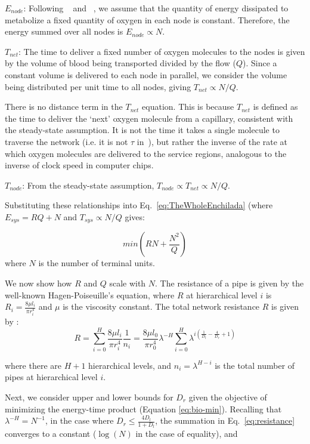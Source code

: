 \documentclass[12pt]{article}
\begin{document}
$E_{node}$: Following ~\cite{west97} and ~\cite{moses08}, we assume that the
quantity of energy dissipated to metabolize a fixed quantity of oxygen in each
node is constant.  Therefore, the energy summed over all nodes is $E_{node} \propto
N$.

$T_{net}$: The time to deliver a fixed number of oxygen molecules to the nodes
is given by the volume of blood being transported divided by the flow ($Q$).
Since a constant volume is delivered to each node in parallel, we consider the
volume being distributed per unit time to all nodes, giving $T_{net}\propto
N/Q$.  

There is no distance term in the $T_{net}$ equation.  This is because $T_{net}$  is
defined as the time to deliver the `next'
oxygen molecule from a capillary, consistent with the
steady-state assumption.   It is not the time it takes a
single molecule to traverse the network (i.e. it is not $\tau$
in~\cite{banavar10}), but rather the inverse of the rate at which
oxygen molecules are delivered to the service regions, analogous to the inverse of clock speed in computer chips.

$T_{node}$: From the steady-state assumption, $T_{node} \propto T_{net} \propto N/Q$. 



Substituting these relationships into Eq.~\ref{eq:TheWholeEnchilada} (where $E_{sys} = RQ + N$ and $T_{sys} \propto N/Q$ gives:

\begin{equation}
 min (RN + \frac{N^2}{Q})
\label{eq:bio-min}
\end{equation}
\noindent where $N$ is the number of terminal units.  

We now show how $R$ and $Q$ scale with $N$. The resistance of a pipe is given by the well-known Hagen-Poiseuille's
equation, where $R$ at hierarchical level $i$ is $R_i = \frac{8\mu l_i}{\pi
r_i^4}$ and $\mu$ is the viscosity constant.  The total network resistance
$R$ is given by \cite{west97}:
\begin{equation}
\label{eq:resistance}
R = \sum_{i=0}^H \frac{8\mu l_i}{\pi r_i^4}\frac{1}{n_i}
= \frac{8\mu l_0}{\pi r_0^4} \lambda^{-H}\sum_{i=0}^H \lambda^{i 
\left(\frac{1}{D_l} - \frac{4}{D_r} + 1 \right)}
\end{equation}

\noindent where there are $H+1$ hierarchical levels, and $n_i = \lambda^{H-i}$
is the total number of pipes at hierarchical level $i$.  

Next, we consider upper and lower bounds for $D_r$ given the objective
of minimizing the energy-time product (Equation \ref{eq:bio-min}).  Recalling
that $\lambda^{-H} = N^{-1}$, in the case
where $D_r \leq \frac{4D_l}{1+D_l}$, the summation in Eq.~\ref{eq:resistance} converges to a
constant ($\log(N)$ in the case of equality), and 
\end{document}
